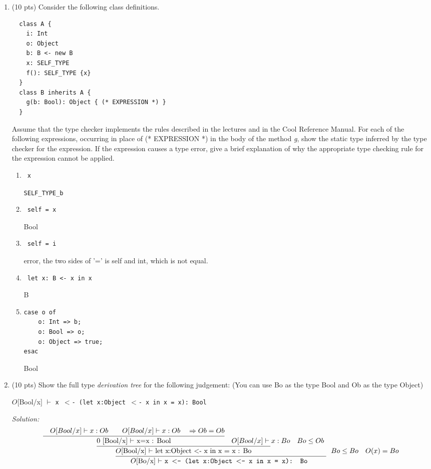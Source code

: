 \documentclass[10pt]{article}
\newcommand{\infertext}[2]{\infer{{\textrm{#1}}}{#2}}
\begin{document}
\begin{enumerate}
\item (10 pts) Consider the following class definitions.
\begin{verbatim}
  class A {
    i: Int
    o: Object
    b: B <- new B
    x: SELF_TYPE
    f(): SELF_TYPE {x}
  }
  class B inherits A {
    g(b: Bool): Object { (* EXPRESSION *) }
  }
\end{verbatim}

Assume that the type checker implements the rules described in the lectures and in the Cool Reference
Manual. For each of the following expressions, occurring in place of (* EXPRESSION *) in the body
of the method \emph{g}, show the static type inferred by the type checker for the expression. If the expression
causes a type error, give a brief explanation of why the appropriate type checking rule for the expression
cannot be applied.

\begin{enumerate}
  \item \begin{verbatim} x    \end{verbatim}
  \verb |SELF_TYPE_b|
  \item \begin{verbatim} self = x \end{verbatim}
  Bool
  \item \begin{verbatim} self = i \end{verbatim}
  error, the two sides of '=' is self and int, which is not equal.
  \item \begin{verbatim} let x: B <- x in x \end{verbatim}
  B
  \item \begin{verbatim}
case o of
    o: Int => b;
    o: Bool => o;
    o: Object => true;
esac
\end{verbatim}
Bool
\end{enumerate}

\medskip

\item (10 pts) Show the full type \emph{derivation tree }for the following judgement:
(You can use Bo as the type Bool and Ob as the type Object)

\begin{center}
$O$[Bool/x] $\vdash$ \tt{x $<$- (let x:Object $<$- x in x = x): Bool}
\end{center}
 {\em Solution:}
\[
  \infertext
  {$O$[Bo/x] $\vdash$ \tt{x $<$- (let x:Object $<$- x in x = x): Bo}
  }
  {\infertext
    {$O$[Bool/x] $\vdash$ let x:Object $<$- x in x = x : Bo}
    {
    \infertext
    {$0$ [Bool/x] $\vdash$ x=x : Bool}
    {\quad O[Bool/x] \vdash x: Ob \quad
    \quad O[Bool/x] \vdash x: Ob \quad
\Rightarrow Ob = Ob
    }
    \quad O[Bool/x]  \vdash x:Bo
    \quad Bo \leq Ob
    }
    \quad Bo \leq Bo
    \quad O(x) = Bo  
  }
\]


\end{enumerate}
\end{document}
